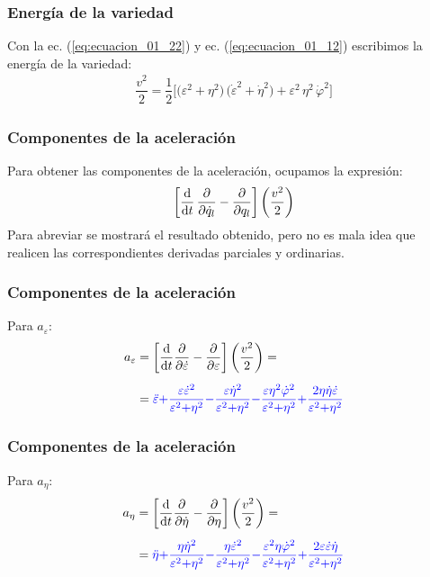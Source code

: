 \documentclass[12pt]{beamer}
\begin{document}
\begin{frame}
\frametitle{Energía de la variedad}
Con la ec. (\ref{eq:ecuacion_01_22}) y ec. (\ref{eq:ecuacion_01_12}) escribimos la energía de la variedad:
\pause
\begin{align}
\dfrac{v^{2}}{2} = \dfrac{1}{2} \bigg[ \big( \varepsilon^{2} + \eta^{2} \big) \, \big( \dot{\varepsilon}^{2} + \dot{\eta}^{2} \big) + \varepsilon^{2} \, \eta^{2} \, \dot{\varphi}^{2} \bigg]
\label{eq:ecuacion_01_23}
\end{align}  
\end{frame}
\begin{frame}
\frametitle{Componentes de la aceleración}
Para obtener las componentes de la aceleración, ocupamos la expresión:
\pause
\begin{align*}
\bigg[ \dv{t} \, \pdv{\dot{q}_{l}} - \pdv{q_{l}} \bigg] \left( \dfrac{v^{2}}{2} \right)
\end{align*}
\pause
Para abreviar se mostrará el resultado obtenido, pero no es mala idea que realicen las correspondientes derivadas parciales y ordinarias.
\end{frame}
\begin{frame}
\frametitle{Componentes de la aceleración}
Para $a_{\varepsilon}$:
\pause
\begin{align*}
a_{\varepsilon} &= \bigg[ \dv{t} \pdv{\dot{\varepsilon}} - \pdv{\varepsilon} \bigg] \left( \dfrac{v^{2}}{2} \right) = \\[0.5em] 
&= \textcolor{blue}{\ddot{\varepsilon} {+} \dfrac{\varepsilon \dot{\varepsilon}^{2}}{\varepsilon^{2} {+} \eta^{2}} {-} \dfrac{\varepsilon \dot{\eta}^{2}}{\varepsilon^{2} {+} \eta^{2}} {-} \dfrac{\varepsilon \eta^{2} \dot{\varphi}^{2}}{\varepsilon^{2} {+} \eta^{2}} {+} \dfrac{2 \eta \dot{\eta} \dot{\varepsilon}}{\varepsilon^{2} {+} \eta^{2}}}
\end{align*}
\end{frame}
\begin{frame}
\frametitle{Componentes de la aceleración}
Para $a_{\eta}$:
\pause
\begin{align*}
a_{\eta} &= \bigg[ \dv{t} \pdv{\dot{\eta}} - \pdv{\eta} \bigg] \left( \dfrac{v^{2}}{2} \right) = \\[0.5em]
&= \textcolor{blue}{\ddot{\eta} {+} \dfrac{\eta \dot{\eta}^{2}}{\varepsilon^{2} {+} \eta^{2}} {-} \dfrac{\eta \dot{\varepsilon}^{2}}{\varepsilon^{2} {+} \eta^{2}} {-} \dfrac{\varepsilon^{2} \eta \dot{\varphi}^{2}}{\varepsilon^{2} {+} \eta^{2}} {+} \dfrac{2 \varepsilon \dot{\varepsilon} \dot{\eta}}{\varepsilon^{2} {+} \eta^{2}}}
\end{align*}
\end{frame}
\end{document}

